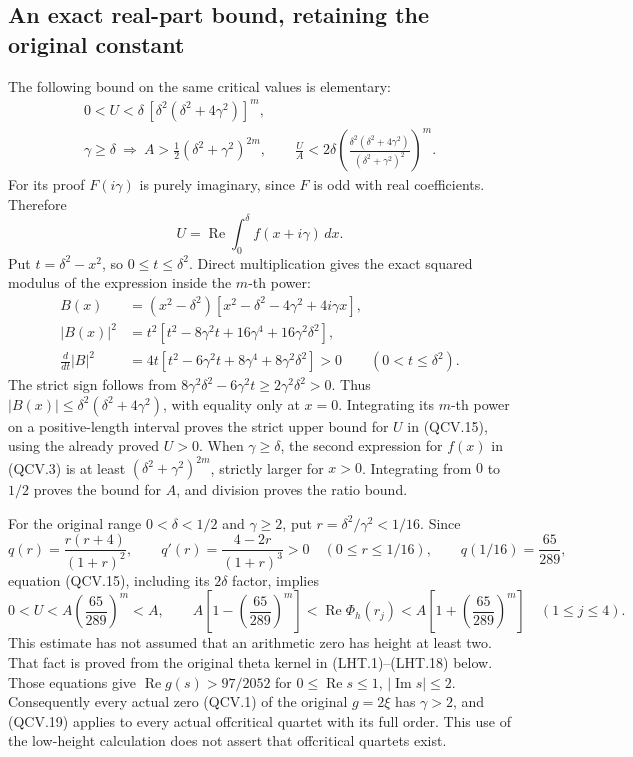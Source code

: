 \subsection{An exact real-part bound, retaining the original constant}

The following bound on the same critical values is elementary:
\[
 \begin{gathered}
 0<U<\delta\,[\delta^2(\delta^2+4\gamma^2)]^m,\\
 \gamma\geq\delta\ \Longrightarrow\
 A>\tfrac12(\delta^2+\gamma^2)^{2m},\qquad
 \frac{U}{A}<2\delta
 \left(\frac{\delta^2(\delta^2+4\gamma^2)}
                 {(\delta^2+\gamma^2)^2}\right)^m.
 \end{gathered}
 \tag{QCV.15}
\]
For its proof \(F(i\gamma)\) is purely imaginary, since \(F\) is
odd with real coefficients. Therefore
\[
 U=\operatorname{Re}\int_0^\delta f(x+i\gamma)\,dx.
 \tag{QCV.16}
\]
Put \(t=\delta^2-x^2\), so \(0\leq t\leq\delta^2\). Direct
multiplication gives the exact squared modulus of the expression
inside the \(m\)-th power:
\[
 \begin{split}
 B(x)&=(x^2-\delta^2)
              [x^2-\delta^2-4\gamma^2+4i\gamma x],\\
 |B(x)|^2&=t^2[t^2-8\gamma^2t+16\gamma^4+16\gamma^2\delta^2],\\
 \frac{d}{dt}|B|^2
   &=4t[t^2-6\gamma^2t+8\gamma^4+8\gamma^2\delta^2]>0
          \qquad(0<t\leq\delta^2).
 \end{split}
 \tag{QCV.17}
\]
The strict sign follows from
\(8\gamma^2\delta^2-6\gamma^2t\geq2\gamma^2\delta^2>0\).
Thus \(|B(x)|\leq\delta^2(\delta^2+4\gamma^2)\), with equality
only at \(x=0\). Integrating its \(m\)-th power on a positive-length
interval proves the strict upper bound for \(U\) in (QCV.15),
using the already proved \(U>0\).
When \(\gamma\geq\delta\), the second expression for \(f(x)\)
in (QCV.3) is at least \((\delta^2+\gamma^2)^{2m}\), strictly
larger for \(x>0\). Integrating from \(0\) to \(1/2\) proves the
bound for \(A\), and division proves the ratio bound.

For the original range \(0<\delta<1/2\) and \(\gamma\geq2\), put
\(r=\delta^2/\gamma^2<1/16\). Since
\[
 q(r)=\frac{r(r+4)}{(1+r)^2},\qquad
 q'(r)=\frac{4-2r}{(1+r)^3}>0\quad(0\leq r\leq1/16),
 \qquad q(1/16)=\frac{65}{289},
 \tag{QCV.18}
\]
equation (QCV.15), including its \(2\delta\) factor, implies
\[
 0<U<A\left(\frac{65}{289}\right)^m<A,
 \qquad
 A\left[1-\left(\frac{65}{289}\right)^m\right]
 <\operatorname{Re}\Phi_h(r_j)
 <A\left[1+\left(\frac{65}{289}\right)^m\right]
 \quad(1\leq j\leq4).
 \tag{QCV.19}
\]
This estimate has not assumed that an arithmetic zero has height at
least two. That fact is proved from the original theta kernel in
(LHT.1)--(LHT.18) below. Those equations give
\(\operatorname{Re}g(s)>97/2052\) for
\(0\leq\operatorname{Re}s\leq1\), \(|\operatorname{Im}s|\leq2\).
Consequently every actual zero (QCV.1) of the original \(g=2\xi\)
has \(\gamma>2\), and (QCV.19) applies to every actual offcritical
quartet with its full order. This use of the low-height calculation
does not assert that offcritical quartets exist.

